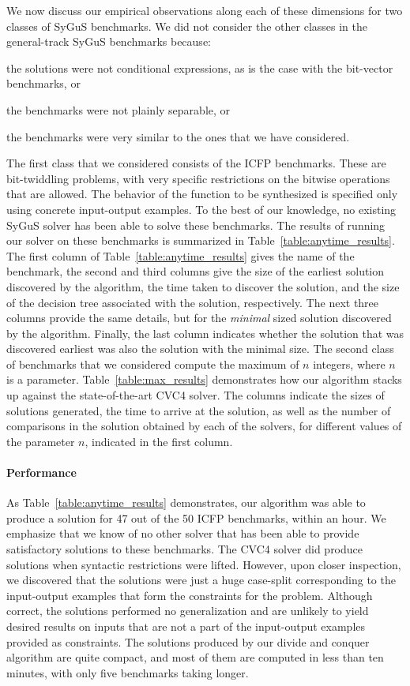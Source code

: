 \documentclass{llncs}
\newcommand{\sygus}{{\sffamily\fontsize{8.5}{10}\selectfont
    SyGuS}\xspace}
\begin{document}
We now discuss our empirical observations along each of these
dimensions for two classes of \sygus benchmarks. We did not consider
the other classes in the general-track \sygus benchmarks because:
\begin{inparaenum}[(a)]
\item
the solutions were not conditional expressions, as is the case
with the bit-vector benchmarks, or
\item
the benchmarks were not plainly separable, or
\item
the benchmarks were very similar to the ones that we have considered.
\end{inparaenum}
The first class that we considered consists of the ICFP
benchmarks. These are bit-twiddling problems, with very specific
restrictions on the bitwise operations that are allowed. The behavior
of the function to be synthesized is specified only using concrete
input-output examples. To the best of our knowledge, no existing
\sygus solver has been able to solve these benchmarks. The results of
running our solver on these benchmarks is summarized in
Table~\ref{table:anytime_results}. The first column of
Table~\ref{table:anytime_results} gives the name of the benchmark, the
second and third columns give the size of the earliest solution
discovered by the algorithm, the time taken to discover the solution,
and the size of the decision tree associated with the solution,
respectively. The next three columns provide the same details, but for
the \emph{minimal} sized solution discovered by the
algorithm. Finally, the last column indicates whether the solution
that was discovered earliest was also the solution with the minimal
size. The second class of benchmarks that we considered compute the
maximum of $n$ integers, where $n$ is a
parameter. Table~\ref{table:max_results} demonstrates how our
algorithm stacks up against the state-of-the-art CVC4 solver. The
columns indicate the sizes of solutions generated, the time to arrive
at the solution, as well as the number of comparisons in the solution
obtained by each of the solvers, for different values of the parameter
$n$, indicated in the first column.

\paragraph{Performance}
As Table~\ref{table:anytime_results} demonstrates, our algorithm was
able to produce a solution for 47 out of the 50 ICFP benchmarks,
within an hour. We emphasize that we know of no other solver that has
been able to provide satisfactory solutions to these benchmarks. The
CVC4 solver did produce solutions when syntactic restrictions were
lifted. However, upon closer inspection, we discovered that the
solutions were just a huge case-split corresponding to the
input-output examples that form the constraints for the
problem. Although correct, the solutions performed no generalization
and are unlikely to yield desired results on inputs that are not a
part of the input-output examples provided as constraints.
The solutions produced by our divide and conquer algorithm are quite
compact, and most of them are computed in less than ten minutes, with
only five benchmarks taking longer.
\end{document}
